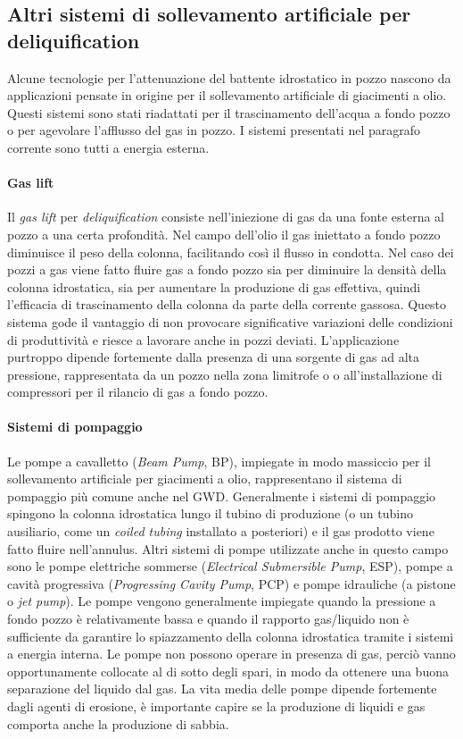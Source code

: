 \subsection{Altri sistemi di sollevamento artificiale per deliquification} 
Alcune tecnologie per l'attenuazione del battente idrostatico in pozzo nascono da applicazioni pensate in origine per il sollevamento artificiale di giacimenti a olio. Questi sistemi sono stati riadattati per il trascinamento dell'acqua a fondo pozzo o per agevolare l'afflusso del gas in pozzo. I sistemi presentati nel paragrafo corrente sono tutti a energia esterna.
\paragraph{Gas lift}
Il \textit{gas lift} per \textit{deliquification} consiste nell'iniezione di gas da una fonte esterna al pozzo a una certa profondità. Nel campo dell'olio il gas iniettato a fondo pozzo diminuisce il peso della colonna, facilitando così il flusso in condotta. Nel caso dei pozzi a gas viene fatto fluire gas a fondo pozzo sia per diminuire la densità della colonna idrostatica, sia per aumentare la produzione di gas effettiva, quindi l'efficacia di trascinamento della colonna da parte della corrente gassosa. Questo sistema gode il vantaggio di non provocare significative variazioni delle condizioni di produttività e riesce a lavorare anche in pozzi deviati. L'applicazione purtroppo dipende fortemente dalla presenza di una sorgente di gas ad alta pressione, rappresentata da un pozzo nella zona limitrofe o o all'installazione di compressori per il rilancio di gas a fondo pozzo.
\paragraph{Sistemi di pompaggio}
Le pompe a cavalletto (\textit{Beam Pump}, BP), impiegate in modo massiccio per il sollevamento artificiale per giacimenti a olio, rappresentano il sistema di pompaggio più comune anche nel GWD. Generalmente i sistemi di pompaggio spingono la colonna idrostatica lungo il tubino di produzione (o un tubino ausiliario, come un \textit{coiled tubing} installato a posteriori) e il gas prodotto viene fatto fluire nell'annulus. Altri sistemi di pompe utilizzate anche in questo campo sono le pompe elettriche sommerse (\textit{Electrical Submersible Pump}, ESP), pompe a cavità progressiva (\textit{Progressing Cavity Pump}, PCP) e pompe idrauliche (a pistone o \textit{jet pump}). Le pompe vengono generalmente impiegate quando la pressione a fondo pozzo è relativamente bassa e quando il rapporto gas/liquido non è sufficiente da garantire lo spiazzamento della colonna idrostatica tramite i sistemi a energia interna. Le pompe non possono operare in presenza di gas, perciò vanno opportunamente collocate al di sotto degli spari, in modo da ottenere una buona separazione del liquido dal gas. La vita media delle pompe dipende fortemente dagli agenti di erosione, è importante capire se la produzione di liquidi e gas comporta anche la produzione di sabbia.

